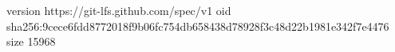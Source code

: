 version https://git-lfs.github.com/spec/v1
oid sha256:9cece6fdd8772018f9b06fc754db658438d78928f3c48d22b1981e342f7e4476
size 15968
